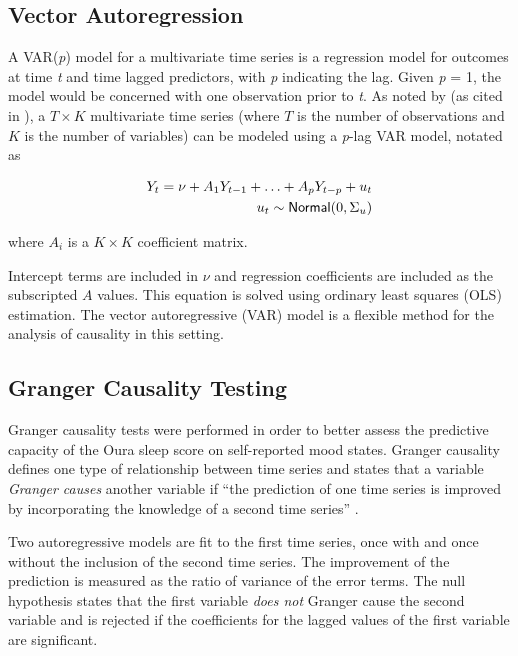 \documentclass[9pt]{article}
\begin{document}
\subsection{Vector Autoregression}\label{vector-autoregression}


A VAR(\textit{p}) model for a multivariate time series is a regression model
for outcomes at time \textit{t} and time lagged predictors, with \textit{p}
indicating the lag. Given \textit{p} = 1, the model would be concerned with one
observation prior to \textit{t}. As noted by \citet{lutkepohlNew2005} (as cited
in \citealt{seabold2010statsmodels}), a \(T \times K\) multivariate time series
(where \(T\) is the number of observations and \(K\) is the number of
variables) can be modeled using a \textit{p}-lag VAR model, notated as


\begin{equation} \begin{split} Y_t = \nu + A_1 Y_{t-1} + \ldots + A_p Y_{t-p} +
u_t \\ u_t \sim {\sf Normal}(0, \Sigma_u) \end{split} \end{equation}

where \(A_i\) is a \(K \times K\) coefficient matrix.


Intercept terms are included in \(\nu\) and regression coefficients are
included as the subscripted \(A\) values. This equation is solved using
ordinary least squares (OLS) estimation. The vector autoregressive (VAR) model
is a flexible method for the analysis of causality in this setting.

\subsection{Granger Causality Testing}\label{granger-causality}

Granger causality tests were performed in order to better assess the predictive
capacity of the Oura sleep score on self-reported mood states. Granger
causality defines one type of relationship between time series
\citep{grangerInvestigating1969} and states that a variable \textit{Granger
causes} another variable if ``the prediction of one time series is improved by
incorporating the knowledge of a second time series'' \citep{boseVector2017}.

Two autoregressive models are fit to the first time series, once with and
once without the inclusion of the second time series. The improvement of the
prediction is measured as the ratio of variance of the error terms. The null
hypothesis states that the first variable \textit{does not} Granger cause the
second variable and is rejected if the coefficients for the lagged values of
the first variable are significant.
\end{document}
